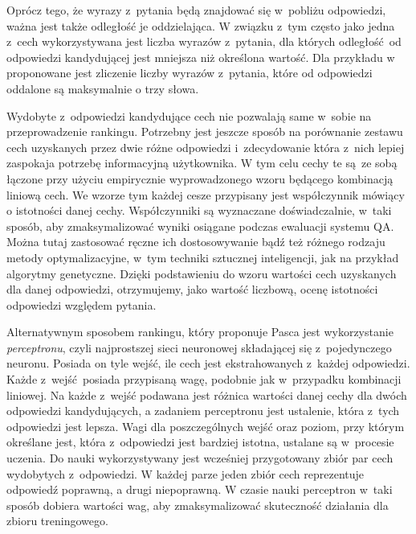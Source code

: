 \documentclass[a4paper, twoside, openright, 12pt]{report}
\begin{document}
            Oprócz tego, że wyrazy z~pytania będą znajdować się w~pobliżu odpowiedzi, ważna jest także odległość je
            oddzielająca. W związku z~tym często jako jedna z~cech wykorzystywana jest liczba wyrazów z~pytania, dla
            których odległość od odpowiedzi kandydującej jest mniejsza niż określona wartość. Dla przykładu w~\cite{PASZKA}
            proponowane jest zliczenie liczby wyrazów z~pytania, które od odpowiedzi oddalone są maksymalnie o trzy słowa.

            Wydobyte z~odpowiedzi kandydujące cech nie pozwalają same w~sobie na przeprowadzenie rankingu. Potrzebny jest
            jeszcze sposób na porównanie zestawu cech uzyskanych przez dwie różne odpowiedzi i~zdecydowanie która z~nich
            lepiej zaspokaja potrzebę informacyjną użytkownika. W tym celu cechy te są ze sobą łączone przy użyciu empirycznie
            wyprowadzonego wzoru będącego kombinacją liniową cech. We wzorze tym każdej cesze przypisany jest
            współczynnik mówiący o istotności danej cechy.
            Współczynniki są wyznaczane doświadczalnie, w~taki sposób, aby zmaksymalizować wyniki osiągane podczas ewaluacji
            systemu QA. Można tutaj zastosować ręczne ich dostosowywanie bądź też różnego rodzaju metody optymalizacyjne,
            w~tym techniki sztucznej inteligencji, jak na przykład algorytmy genetyczne. Dzięki podstawieniu do wzoru
            wartości cech uzyskanych dla danej odpowiedzi, otrzymujemy, jako wartość liczbową, ocenę istotności odpowiedzi
            względem pytania.

            Alternatywnym sposobem rankingu, który proponuje Pasca jest wykorzystanie \emph{perceptronu}\cite{PASZKA},
            czyli najprostszej sieci neuronowej
            składającej się z~pojedynczego neuronu. Posiada on tyle wejść, ile cech jest ekstrahowanych z~każdej odpowiedzi.
            Każde z~wejść posiada przypisaną wagę, podobnie jak w~przypadku kombinacji liniowej. Na każde z~wejść
            podawana jest różnica wartości danej cechy dla dwóch odpowiedzi kandydujących, a zadaniem perceptronu jest
            ustalenie, która z~tych odpowiedzi jest lepsza. Wagi dla poszczególnych wejść oraz poziom, przy którym
            określane jest, która z~odpowiedzi jest bardziej istotna, ustalane są w~procesie uczenia. Do nauki wykorzystywany
            jest wcześniej przygotowany zbiór par cech wydobytych z~odpowiedzi. W każdej parze jeden zbiór cech reprezentuje
            odpowiedź poprawną, a drugi niepoprawną.  W czasie nauki perceptron w~taki sposób dobiera wartości wag,
            aby zmaksymalizować skuteczność działania dla zbioru treningowego.\cite{PERCEPTRONRANKING}
\end{document}
